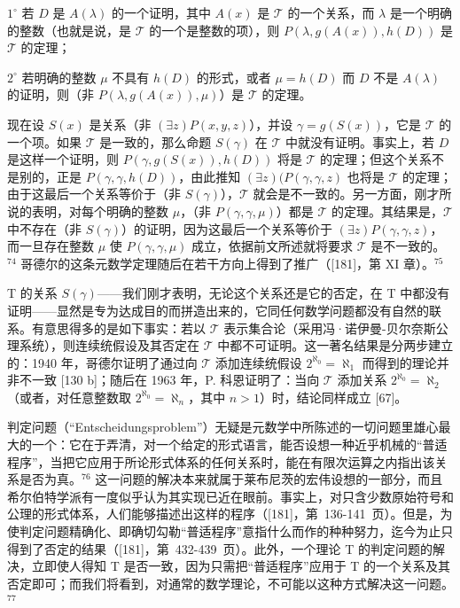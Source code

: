 \(1^{\circ}\) 若 \(D\) 是 \(A(\lambda)\) 的一个证明，其中 \(A(x)\) 是 \(\mathcal{T}\) 的一个关系，而 \(\lambda\) 是一个明确的整数（也就是说，是 \(\mathcal{T}\) 的一个是整数的项），则 \(P(\lambda, g(A(x)), h(D))\) 是 \(\mathcal{T}\) 的定理；

\(2^{\circ}\) 若明确的整数 \(\mu\) 不具有 \(h(D)\) 的形式，或者 \(\mu = h(D)\) 而 \(D\) 不是 \(A(\lambda)\) 的证明，则（非 \(P(\lambda, g(A(x)), \mu)\)）是 \(\mathcal{T}\) 的定理。

现在设 \(S(x)\) 是关系（非 \((\exists z)P(x,y,z)\)），并设 \(\gamma = g(S(x))\)，它是 \(\mathcal{T}\) 的一个项。如果 \(\mathcal{T}\) 是一致的，那么命题 \(S(\gamma)\) 在 \(\mathcal{T}\) 中就没有证明。事实上，若 \(D\) 是这样一个证明，则 \(P(\gamma,g(S(x)),h(D))\) 将是 \(\mathcal{T}\) 的定理；但这个关系不是别的，正是 \(P(\gamma,\gamma,h(D))\)，由此推知 \((\exists z)(P(\gamma,\gamma,z)\) 也将是 \(\mathcal{T}\) 的定理；由于这最后一个关系等价于（非 \(S(\gamma)\)），\(\mathcal{T}\) 就会是不一致的。另一方面，刚才所说的表明，对每个明确的整数 \(\mu\)，（非 \(P(\gamma,\gamma,\mu)\)）都是 \(\mathcal{T}\) 的定理。其结果是，\(\mathcal{T}\) 中不存在（非 \(S(\gamma)\)）的证明，因为这最后一个关系等价于 \((\exists z)P(\gamma,\gamma,z)\)，而一旦存在整数 \(\mu\) 使 \(P(\gamma,\gamma,\mu)\) 成立，依据前文所述就将要求 \(\mathcal{T}\) 是不一致的。\(^{74}\) 哥德尔的这条元数学定理随后在若干方向上得到了推广（{[}181{]}，第 XI 章）。\(^{75}\)

T 的关系 \(S(\gamma)\)——我们刚才表明，无论这个关系还是它的否定，在 T 中都没有证明——显然是专为达成目的而拼造出来的，它同任何数学问题都没有自然的联系。有意思得多的是如下事实：若以 \(\mathcal{T}\) 表示集合论（采用冯·诺伊曼-贝尔奈斯公理系统），则连续统假设及其否定在 \(\mathcal{T}\) 中都不可证明。这一著名结果是分两步建立的：1940 年，哥德尔证明了通过向 \(\mathcal{T}\) 添加连续统假设 \(2^{\aleph_0} = \aleph_1\) 而得到的理论并非不一致 {[}130 b{]}；随后在 1963 年，P. 科恩证明了：当向 \(\mathcal{T}\) 添加关系 \(2^{\aleph_0} = \aleph_2\)（或者，对任意整数取 \(2^{\aleph_0} = \aleph_n\)，其中 \(n > 1\)）时，结论同样成立 {[}67{]}。

判定问题（“Entscheidungsproblem”）无疑是元数学中所陈述的一切问题里雄心最大的一个：它在于弄清，对一个给定的形式语言，能否设想一种近乎机械的“普适程序”，当把它应用于所论形式体系的任何关系时，能在有限次运算之内指出该关系是否为真。\(^{76}\) 这一问题的解决本来就属于莱布尼茨的宏伟设想的一部分，而且希尔伯特学派有一度似乎认为其实现已近在眼前。事实上，对只含少数原始符号和公理的形式体系，人们能够描述出这样的程序（{[}181{]}，第~136-141~页）。但是，为使判定问题精确化、即确切勾勒“普适程序”意指什么而作的种种努力，迄今为止只得到了否定的结果（{[}181{]}，第~432-439~页）。此外，一个理论 T 的判定问题的解决，立即使人得知 T 是否一致，因为只需把“普适程序”应用于 T 的一个关系及其否定即可；而我们将看到，对通常的数学理论，不可能以这种方式解决这一问题。\(^{77}\)


